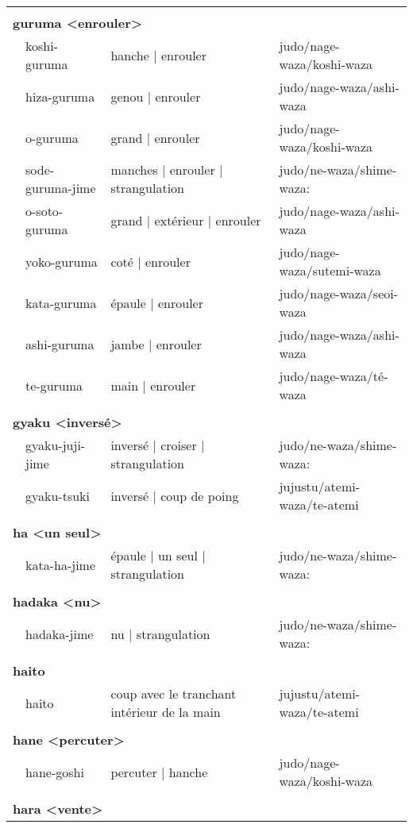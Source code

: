 \documentclass{article}%
\begin{document}
\begin{longtable}{rlll}
&&&\\%
\multicolumn{3}{l}{\textbf{guruma <enrouler>}%
~%
}&\\%
&koshi{-}guruma&hanche | enrouler&judo/nage{-}waza/koshi{-}waza\\%
&hiza{-}guruma&genou | enrouler&judo/nage{-}waza/ashi{-}waza\\%
&o{-}guruma&grand | enrouler&judo/nage{-}waza/koshi{-}waza\\%
&sode{-}guruma{-}jime&manches | enrouler | strangulation&judo/ne{-}waza/shime{-}waza:\\%
&o{-}soto{-}guruma&grand | extérieur | enrouler&judo/nage{-}waza/ashi{-}waza\\%
&yoko{-}guruma&coté | enrouler&judo/nage{-}waza/sutemi{-}waza\\%
&kata{-}guruma&épaule | enrouler&judo/nage{-}waza/seoi{-}waza\\%
&ashi{-}guruma&jambe | enrouler&judo/nage{-}waza/ashi{-}waza\\%
&te{-}guruma&main | enrouler&judo/nage{-}waza/té{-}waza\\%
&&&\\%
\multicolumn{3}{l}{\textbf{gyaku <inversé>}%
~%
}&\\%
&gyaku{-}juji{-}jime&inversé | croiser | strangulation&judo/ne{-}waza/shime{-}waza:\\%
&gyaku{-}tsuki&inversé | coup de poing&jujustu/atemi{-}waza/te{-}atemi\\%
&&&\\%
\multicolumn{3}{l}{\textbf{ha <un seul>}%
~%
}&\\%
&kata{-}ha{-}jime&épaule | un seul | strangulation&judo/ne{-}waza/shime{-}waza:\\%
&&&\\%
\multicolumn{3}{l}{\textbf{hadaka <nu>}%
~%
}&\\%
&hadaka{-}jime&nu | strangulation&judo/ne{-}waza/shime{-}waza:\\%
&&&\\%
\multicolumn{3}{l}{\textbf{haito }%
~%
}&\\%
&haito&coup avec le tranchant intérieur de la main&jujustu/atemi{-}waza/te{-}atemi\\%
&&&\\%
\multicolumn{3}{l}{\textbf{hane <percuter>}%
~%
}&\\%
&hane{-}goshi&percuter | hanche&judo/nage{-}waza/koshi{-}waza\\%
&&&\\%
\multicolumn{3}{l}{\textbf{hara <vente>}%
~%
}
\end{longtable}
\end{document}
